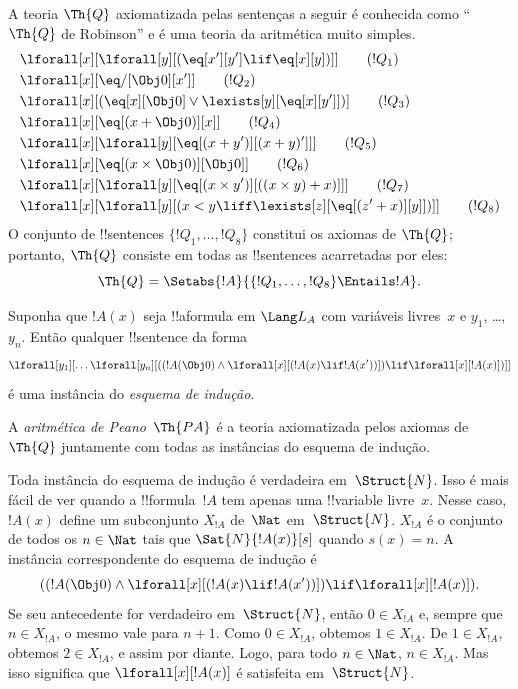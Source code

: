 \documentclass[../../../include/open-logic-section]{subfiles}
\begin{document}
\begin{defn}
A teoria $\Th{Q}$ axiomatizada pelas sentenças a seguir é conhecida
como ``$\Th{Q}$ de Robinson'' e é uma teoria da aritmética muito
simples.
\begin{align*}
& \lforall[x][\lforall[y][(\eq[x'][y'] \lif \eq[x][y])]] \tag{$!Q_1$}\\
& \lforall[x][\eq/[\Obj 0][x']] \tag{$!Q_2$}\\
& \lforall[x][(\eq[x][\Obj 0] \lor \lexists[y][\eq[x][y']])] \tag{$!Q_3$}\\
& \lforall[x][\eq[(x + \Obj 0)][x]] \tag{$!Q_4$}\\
& \lforall[x][\lforall[y][\eq[(x + y')][(x + y)']]] \tag{$!Q_5$}\\
& \lforall[x][\eq[(x \times \Obj 0)][\Obj 0]] \tag{$!Q_6$}\\
& \lforall[x][\lforall[y][\eq[(x \times y')][((x \times y) + x)]]] \tag{$!Q_7$}\\
& \lforall[x][\lforall[y][(x < y \liff \lexists[z][\eq[(z' + x)][y]])]] \tag{$!Q_8$}
\end{align*}
O conjunto de !!{sentence}s $\{!Q_1, \dots, !Q_8\}$ constitui os
axiomas de $\Th{Q}$; portanto, $\Th{Q}$ consiste em todas as
!!{sentence}s acarretadas por eles:
\[
\Th{Q} = \Setabs{!A}{\{!Q_1, \dots, !Q_8\} \Entails !A}.
\]
\end{defn}

\begin{defn}
Suponha que $!A(x)$ seja !!a{formula} em $\Lang L_A$ com variáveis
livres~$x$ e $y_1$, \dots, $y_n$. Então qualquer !!{sentence} da forma
\[
\lforall[y_1][\dots\lforall[y_n][((!A(\Obj 0) \land \lforall[x][(!A(x)
\lif !A(x'))]) \lif \lforall[x][!A(x)])]]
\]
é uma instância do \emph{esquema de indução}.

A \emph{aritmética de Peano}~$\Th{PA}$ é a teoria axiomatizada pelos
axiomas de $\Th{Q}$ juntamente com todas as instâncias do esquema de
indução.
\end{defn}

\begin{explain}
Toda instância do esquema de indução é verdadeira em~$\Struct{N}$.
Isso é mais fácil de ver quando a !!{formula}~$!A$ tem apenas uma
!!{variable} livre~$x$. Nesse caso, $!A(x)$ define um subconjunto
$X_{!A}$ de~$\Nat$ em~$\Struct{N}$. $X_{!A}$ é o conjunto de todos os
$n \in \Nat$ tais que $\Sat{N}{!A(x)}[s]$ quando $s(x) = n$. A
instância correspondente do esquema de indução é
\[
((!A(\Obj 0) \land \lforall[x][(!A(x) \lif !A(x'))]) \lif 
  \lforall[x][!A(x)]).
\]
Se seu antecedente for verdadeiro em~$\Struct{N}$, então
$0 \in X_{!A}$ e, sempre que $n \in X_{!A}$, o mesmo vale para $n+1$.
Como $0 \in X_{!A}$, obtemos $1 \in X_{!A}$. De $1 \in X_{!A}$,
obtemos $2 \in X_{!A}$, e assim por diante. Logo, para todo
$n \in \Nat$, $n \in X_{!A}$. Mas isso significa que
$\lforall[x][!A(x)]$ é satisfeita em~$\Struct{N}$.
\end{explain}
\end{document}
